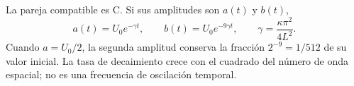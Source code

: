 La pareja compatible es \(\mathrm C\). Si sus amplitudes son \(a(t)\) y \(b(t)\),
\[
a(t)=U_0e^{-\gamma t},\qquad b(t)=U_0e^{-9\gamma t},
\qquad \gamma=\frac{\kappa\pi^2}{4L^2}.
\]
Cuando \(a=U_0/2\), la segunda amplitud conserva la fracción \(2^{-9}=1/512\) de su valor inicial. La tasa de decaimiento crece con el cuadrado del número de onda espacial; no es una frecuencia de oscilación temporal.
